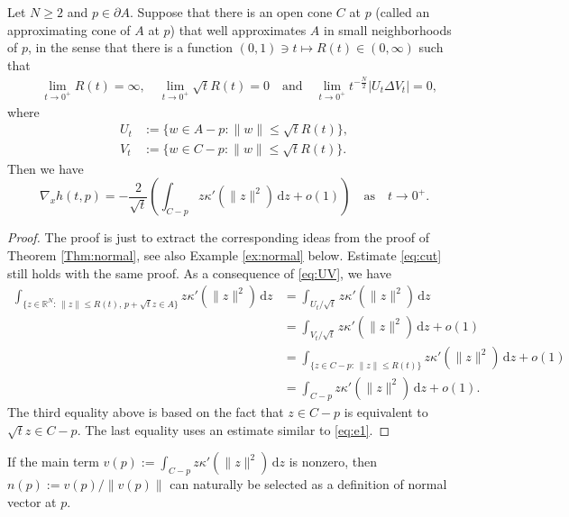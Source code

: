 \documentclass[graybox]{svmult}
\renewcommand{\d}{\mathrm{d}}  %
\newcommand{\R}{\mathbb{R}}  %
\renewcommand{\AA}{A}  %
\newcommand{\pp}{p}
\begin{document}
\begin{theorem}\label{Thm:gen} Let $N\ge2$ and $\pp\in \partial\AA$. Suppose that there is an open cone $C$ at $\pp$ (called an approximating cone of $\AA$ at $\pp$) that well approximates $\AA$ in small neighborhoods of $\pp$, in the sense that there is a function $(0,1) \ni t\mapsto R(t) \in (0,\infty)$ such that 
\begin{align}
&\lim_{t\to0^+}R(t)=\infty, \quad \lim_{t\to0^+}\sqrt{t}R(t)=0 \quad \text{and}  \quad \lim_{t\to0^+}t^{-\frac{N}{2}}|U_t \Delta V_t| =0,  \label{eq:UV}
\end{align}
where 
\begin{align*}
U_t &:=\{w\in  \AA-\pp: \|w\|\le \sqrt{t}R(t) \}, \\
V_t &:=\{w \in C - \pp: \|w\| \le \sqrt{t}R(t) \}. 
\end{align*}
Then we have 
\begin{equation} \label{eq:normal3}
\nabla_x h(t,\pp) = -  \frac{2}{\sqrt{t}}  \left(\int_{C-\pp} z \kappa'(\|z  \|^2) \,\d z + o(1)\right) \quad  \text{as}\quad t\to 0^+. 
\end{equation}
\end{theorem}
\begin{proof}
The proof is just to extract the corresponding ideas from the proof of Theorem  \ref{Thm:normal}, see also Example \ref{ex:normal} below. Estimate \eqref{eq:cut} still holds with the same proof. As a consequence of \eqref{eq:UV}, we have 
\begin{align*}
 \int_{\{z\in \R^N:\, \|z\|\leq R(t),\, \pp+\sqrt{t}z \in \AA\}} z \kappa'(\|z\|^2) \,\d z 
 &=   \int_{U_t/\sqrt{t}} z \kappa'(\|z\|^2) \,\d z  \\
&=  \int_{V_t/\sqrt{t}} z \kappa'(\|z\|^2) \,\d z +o(1)  \\
&=  \int_{\{z\in C - \pp:\, \|z\|\leq R(t)\}} z \kappa'(\|z\|^2) \,\d z +o(1) \\
&= \int_{C - \pp} z \kappa'(\|z\|^2) \,\d z + o(1).  
\end{align*}
The third equality above is based on the fact that $z \in C-\pp$ is equivalent to $\sqrt{t}z \in C-\pp$. 
The last equality uses an estimate similar to \eqref{eq:e1}. 
\end{proof}

\begin{remark} If the main term $v(p):=\int_{C-\pp} z \kappa'(\|z  \|^2) \,\d z$ is nonzero, then $n(p):=v(p)/\|v(p)\|$ can naturally be selected as a definition of normal vector at $p$.  
\end{remark}
\end{document}
